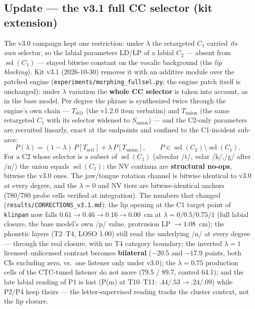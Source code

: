 \documentclass[11pt,a4paper]{article}
\begin{document}
\subsection{Update --- the v3.1 full CC selector (kit extension)}
\label{sec:fullsel-report}
The v3.0 campaign kept one restriction: under $\lambda$ the retargeted
$C_1$ carried \emph{its own} selector, so the labial parameters
LD/LP of a labial $C_2$ --- absent from $\operatorname{sel}(C_1)$ ---
stayed bitwise constant on the vocalic background (the \emph{lip
blocking}).  Kit v3.1 (2026-10-30) removes it with an additive module
over the patched engine (\texttt{experiments/morphing\_fullsel.py};
the engine patch itself is unchanged): under $\lambda$ variation the
\textbf{whole CC selector} is taken into account, as in the base
model.  Per degree the phrase is synthesized twice through the
engine's own chain --- $T_{\mathrm{sel1}}$ (the v1.2.0 item verbatim)
and $T_{\mathrm{union}}$ (the same retargeted $C_1$ with its selector
widened to $S_{\text{union}}$) --- and the C2-only parameters are
recruited linearly, exact at the endpoints and confined to the
C1-incident sub-arcs:
\begin{equation}
P(\lambda) = (1-\lambda)\,P\!\left[T_{\mathrm{sel1}}\right]
+ \lambda\,P\!\left[T_{\mathrm{union}}\right],
\qquad P \in \operatorname{sel}(C_2) \setminus \operatorname{sel}(C_1).
\end{equation}
For a C2 whose selector is a subset of $\operatorname{sel}(C_1)$
(alveolar /t/, velar /k/,/g/ after /n/) the union equals
$\operatorname{sel}(C_1)$: the NV continua are \textbf{structural
no-ops}, bitwise the v3.0 ones.  The jaw/tongue rotation channel is
bitwise identical to v3.0 at every degree, and the $\lambda = 0$ and
NV tiers are bitwise-identical anchors (780/780 probe cells verified
at integration).  The numbers that changed
(\texttt{results/CORRECTIONS\_v3.1.md}): the lip opening at the C1
target point of \texttt{klinpan} now falls $0.61 \to 0.46 \to 0.16
\to \mathbf{0.00}$~cm at $\lambda = 0/0.5/0.75/1$ (full labial
closure, the base model's own /p/ value, protrusion LP $\to
1.08$~cm); the phonetic layers (T2--T4, LOSO 1.00) still read the
underlying /n/ at every degree --- through the real closure, with no
T4 category boundary; the inverted $\lambda = 1$ licensed--unlicensed
contrast becomes \textbf{bilateral} ($-20.5$ and $-17.9$ points, both
CIs excluding zero, vs.\ one listener only under v3.0); the
$\lambda = 0.75$ production cells of the CTC-tuned listener do not
move (79.5 / 89.7, control 64.1); and the late labial reading of P1
is lost (P(m) at T10--T11: $.44/.53 \to .24/.09$) while P2/P4 keep
theirs --- the letter-supervised reading tracks the cluster context,
not the lip closure.
\end{document}
